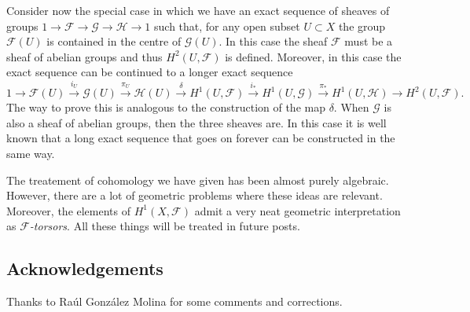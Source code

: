 	      Consider now the special case in which we have an exact sequence of sheaves of groups $1\rightarrow \mathcal{F} \rightarrow \mathcal{G} \rightarrow \mathcal{H} \rightarrow 1$ such that, for any open subset $U \subset X$ the group $\mathcal{F}(U)$ is contained in the centre of $\mathcal{G}(U)$. In this case the sheaf $\mathcal{F}$ must be a sheaf of abelian groups and thus $H^2(U,\mathcal{F})$ is defined. Moreover, in this case the exact sequence can be continued to a longer exact sequence
	    \begin{equation*}
	      1\rightarrow \mathcal{F}(U) \overset{i_U}{\rightarrow} \mathcal{G}(U) \overset{\pi_U}{\rightarrow} \mathcal{H}(U) \overset{\delta}{\rightarrow} H^1(U,\mathcal{F}) \overset{i_*}{\rightarrow} H^1(U,\mathcal{G}) \overset{\pi_*}{\rightarrow} H^1(U,\mathcal{H}) \rightarrow H^2(U,\mathcal{F}).
	    \end{equation*}
	    The way to prove this is analogous to the construction of the map $\delta$.
When $\mathcal{G}$ is also a sheaf of abelian groups, then the three sheaves are. In this case it is well known that a long exact sequence that goes on forever can be constructed in the same way.

The treatement of cohomology we have given has been almost purely algebraic. However, there are a lot of geometric problems where these ideas are relevant. Moreover, the elements of $H^1(X,\mathcal{F})$ admit a very neat geometric interpretation as \emph{$\mathcal{F}$-torsors}. All these things will be treated in future posts.


\subsection*{Acknowledgements}
Thanks to Raúl González Molina for some comments and corrections.



